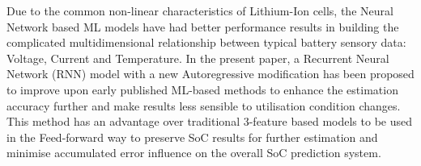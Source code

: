 {    Due to the common non-linear characteristics of Lithium-Ion cells, the Neural Network based ML models have had better performance results in building the complicated multidimensional relationship between typical battery sensory data: Voltage, Current and Temperature.
    In the present paper, a Recurrent Neural Network (RNN) model with a new Autoregressive modification has been proposed to improve upon early published ML-based methods to enhance the estimation accuracy further and make results less sensible to utilisation condition changes.
    This method has an advantage over traditional 3-feature based models to be used in the Feed-forward way to preserve SoC results for further estimation and minimise accumulated error influence on the overall SoC prediction system.
}